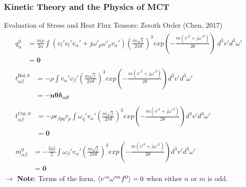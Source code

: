 \documentclass{beamer}
\begin{document}
\begin{frame}
\frametitle{Kinetic Theory and the Physics of MCT}
Evaluation of Stress and Heat Flux Tensors: Zeroth Order (Chen, 2017)
\small
\begin{align*}
\begin{split}
 \label{zeroheatfluxkinetic}
q^{0}_{\alpha} &= \frac{m\rho}{2n}\int (v_l'v_l'v_\alpha' + 
j\omega'_p\omega'_pv_\alpha') (\frac{m\sqrt{j}}{2\pi\theta})^3 
 exp(-\frac{m(v'^2 + j\omega'^2)}{2\theta})\ 
d^3v'd^3\omega' \\ &= \mathbf{0}
\end{split}
\\
\begin{split}
 \label{zeroBoltzmannstress}
t^{\text{Bol}, 0}_{\alpha \beta} &= -\rho\int 
v_\alpha'v_\beta' 
(\frac{m\sqrt{j}}{2\pi\theta})^3 
exp(-\frac{m(v'^2 + j\omega'^2)}{2\theta}) d^3v' d^3 
\omega' \\ 
&= \mathbf{-n}\bm{\theta\delta_{\alpha \beta}}
\end{split}
\\
\begin{split}
 \label{zeroCurtissstress} 
t^{\text{Cur}, 0}_{\alpha \beta} &= -\rho\epsilon_{\beta 
pq}r_{p}\int 
\omega_q'v_{\alpha}' 
(\frac{m\sqrt{j}}{2\pi\theta})^3 exp(-\frac{m(v'^2 + 
j\omega'^2)}{2\theta}) d^3v' d^3 \omega'\\ 
&= \mathbf{0} 
\end{split}
\\
\begin{split}
 \label{zeromomentstress}
 m^0_{\alpha \beta} &= -\frac{3\rho j}{2} \int 
\omega_{\beta}'v_{\alpha}' (\frac{m\sqrt{j}}{2\pi\theta})^3 
exp(-\frac{m(v'^2 + j\omega'^2)}{2\theta}) d^3v' d^3 \omega' 
\\ &= \mathbf{0} 
\end{split}
\end{align*}
\pause
$\rightarrow$ \textbf{Note}: Terms of the form, $\langle v`^{n}\omega'^{m}f^{0} 
\rangle = 0$ when either $n$ or $m$ is odd.
\end{frame}
\end{document}
